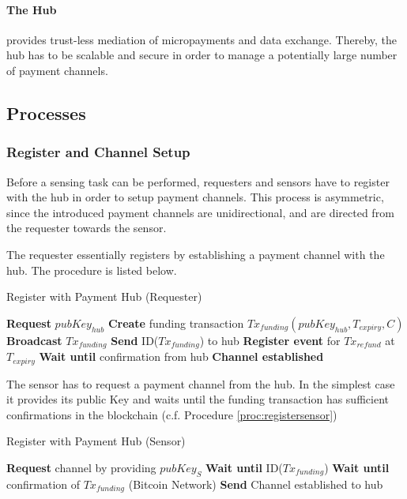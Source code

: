\paragraph{The Hub} provides trust-less mediation of micropayments and data exchange. Thereby, the hub has to be scalable and secure in order to manage a potentially large number of payment channels. 


\subsection{Processes}

\subsubsection{Register and Channel Setup}

Before a sensing task can be performed, requesters and sensors have to register with the hub in order to setup payment channels. This process is asymmetric, since the introduced payment channels are unidirectional, and are directed from the requester towards the sensor.

The requester essentially registers by establishing a payment channel with the hub. The procedure is listed below.

\begin{algorithm}
   \caption{Register with Payment Hub (Requester)}
    \begin{algorithmic}[1]
      \State \textbf{Request} $pubKey_{hub}$
      \State \textbf{Create} funding transaction $Tx_{funding}(pubKey_{hub},T_{expiry},C)$
      \State \textbf{Broadcast} $Tx_{funding}$
      \State \textbf{Send} ID($Tx_{funding}$) to hub
      \State \textbf{Register event} for $Tx_{refund}$ at $T_{expiry}$ 
      \State \textbf{Wait until} confirmation from hub
      \State \textbf{Channel established}
\end{algorithmic}
\end{algorithm}

The sensor has to request a payment channel from the hub. In the simplest case it provides its public Key and waits until the funding transaction has sufficient confirmations in the blockchain (c.f. Procedure \ref{proc:registersensor}) 

\begin{algorithm}
   \caption{Register with Payment Hub (Sensor)}
    \begin{algorithmic}[1]
      \State \textbf{Request} channel by providing $pubKey_{S}$
      \State \textbf{Wait until} ID($Tx_{funding}$)
      \State \textbf{Wait until} confirmation of $Tx_{funding}$ (Bitcoin Network)
      \State \textbf{Send} Channel established to hub
\end{algorithmic}
\label{proc:registersensor}
\end{algorithm}

